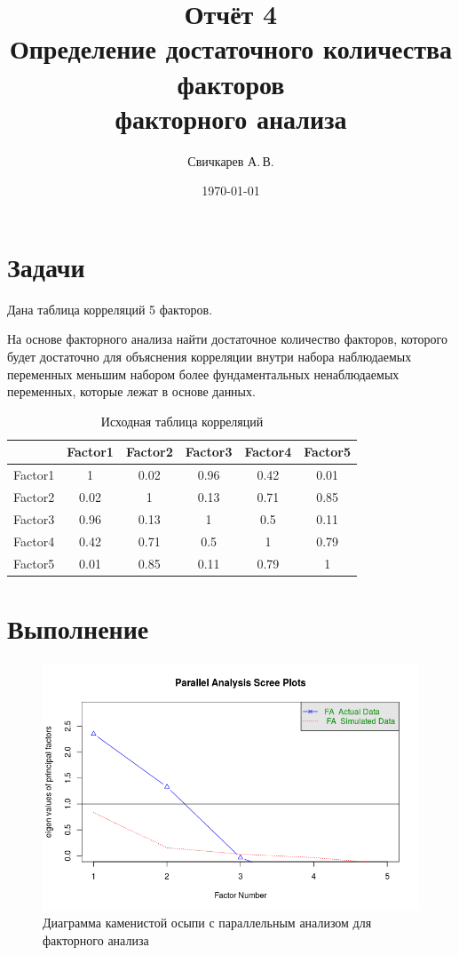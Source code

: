 \documentclass{article} %
\title{Отчёт 4\\
Определение достаточного количества факторов\\
факторного анализа} %
\author{Свичкарев А.\,В.} %
\date{\today} %
\begin{document}

\maketitle %

\section*{Задачи}
Дана таблица корреляций 5 факторов.

На основе факторного анализа найти
достаточное количество факторов,
которого будет достаточно для
объяснения корреляции внутри набора наблюдаемых переменных
меньшим набором более фундаментальных ненаблюдаемых
переменных, которые лежат в основе данных.
\begin{table}[H]
\centering
\begin{tabular}{|c|c|c|c|c|c|}
\hline
        & Factor1 & Factor2 & Factor3 & Factor4 & Factor5\\ \hline
Factor1 & 1       & 0.02    & 0.96    & 0.42    & 0.01 \\ \hline
Factor2 & 0.02    & 1       & 0.13    & 0.71    & 0.85 \\ \hline
Factor3 & 0.96    & 0.13    & 1       & 0.5     & 0.11 \\ \hline
Factor4 & 0.42    & 0.71    & 0.5     & 1       & 0.79 \\ \hline
Factor5 & 0.01    & 0.85    & 0.11    & 0.79    & 1    \\ \hline
\end{tabular}
\caption{Исходная таблица корреляций}
\end{table}

\clearpage
\section*{Выполнение}
\begin{figure}[H]
    \centering
    \includegraphics[width=\textwidth]{screeFa}
    \caption{Диаграмма каменистой осыпи с параллельным анализом
    для факторного анализа}
\end{figure}
\end{document}
